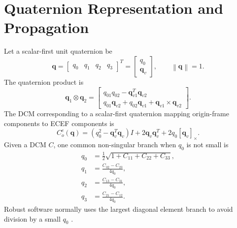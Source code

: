 \documentclass[11pt,oneside]{book}
\newcommand{\norm}[1]{\left\lVert #1 \right\rVert}
\begin{document}
\section{Quaternion Representation and Propagation}

Let a scalar-first unit quaternion be
\begin{equation}
\mathbf{q}=
\begin{bmatrix}
q_0 & q_1 & q_2 & q_3
\end{bmatrix}^T
=
\begin{bmatrix}
q_0\\
\mathbf{q}_v
\end{bmatrix},
\qquad
\norm{\mathbf{q}}=1.
\end{equation}
The quaternion product is
\begin{equation}
\mathbf{q}_1\otimes\mathbf{q}_2=
\begin{bmatrix}
q_{01}q_{02}-\mathbf{q}_{v1}^T\mathbf{q}_{v2}\\
q_{01}\mathbf{q}_{v2}+q_{02}\mathbf{q}_{v1}+\mathbf{q}_{v1}\times\mathbf{q}_{v2}
\end{bmatrix}.
\end{equation}
The DCM corresponding to a scalar-first quaternion mapping origin-frame components to ECEF components is
\begin{equation}
C_o^e(\mathbf{q})
=
(q_0^2-\mathbf{q}_v^T\mathbf{q}_v)I
+
2\mathbf{q}_v\mathbf{q}_v^T
+
2q_0[\mathbf{q}_v]_\times.
\end{equation}
Given a DCM $C$, one common non-singular branch when $q_0$ is not small is
\begin{align}
q_0 &= \frac{1}{2}\sqrt{1+C_{11}+C_{22}+C_{33}},\\
q_1 &= \frac{C_{32}-C_{23}}{4q_0},\\
q_2 &= \frac{C_{13}-C_{31}}{4q_0},\\
q_3 &= \frac{C_{21}-C_{12}}{4q_0}.
\end{align}
Robust software normally uses the largest diagonal element branch to avoid division by a small $q_0$ \cite{titterton2004,groves2013,sola2018}.
\end{document}
